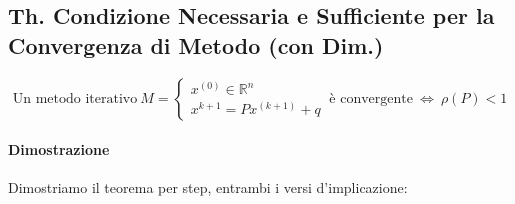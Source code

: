 \documentclass{article}
\begin{document}
\subsection{Th. Condizione Necessaria e Sufficiente per la Convergenza di Metodo (con Dim.)}

\vspace*{12px}

\[ \text{Un metodo iterativo} \: M = \left\{ \begin{array}{rcl}
    x^{(0)} \in \mathbb{R}^{n} \\ 
    x^{k+1} = Px^{(k+1)} + q 
    \end{array}\right.
    \: \text{è convergente} \:
    \Longleftrightarrow
    \:
    \rho(P) < 1
    \]

\paragraph{Dimostrazione} Dimostriamo il teorema per step, entrambi i versi d'implicazione:
\end{document}
